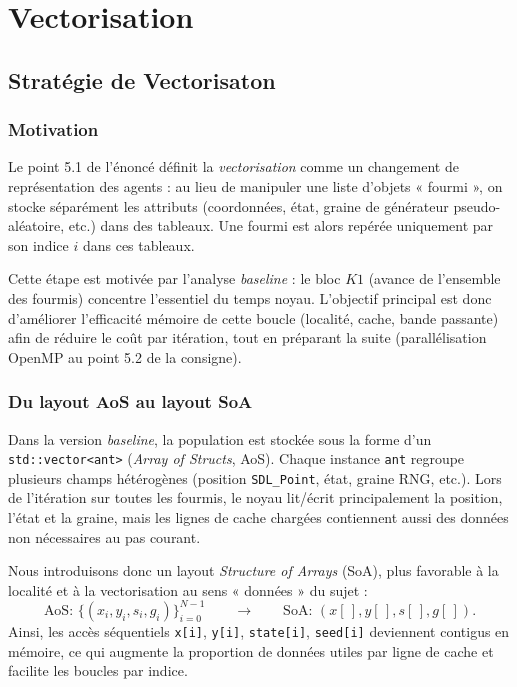 \section{Vectorisation}

\subsection{Stratégie de Vectorisaton}

\subsubsection{Motivation}

Le point 5.1 de l'énoncé définit la \emph{vectorisation} comme un changement de représentation des agents :
au lieu de manipuler une liste d'objets « fourmi », on stocke séparément les attributs (coordonnées, état,
graine de générateur pseudo-aléatoire, etc.) dans des tableaux. Une fourmi est alors repérée uniquement par
son indice $i$ dans ces tableaux.

Cette étape est motivée par l'analyse \emph{baseline} : le bloc $K1$ (avance de l'ensemble des fourmis)
concentre l'essentiel du temps noyau. L'objectif principal est donc d'améliorer l'efficacité mémoire de cette
boucle (localité, cache, bande passante) afin de réduire le coût par itération, tout en préparant la suite
(parallélisation OpenMP au point 5.2 de la consigne).

\subsubsection{Du layout AoS au layout SoA}

Dans la version \emph{baseline}, la population est stockée sous la forme d'un \texttt{std::vector<ant>}
(\textit{Array of Structs}, AoS). Chaque instance \texttt{ant} regroupe plusieurs champs hétérogènes
(position \texttt{SDL\_Point}, état, graine RNG, etc.). Lors de l'itération sur toutes les fourmis, le noyau
lit/écrit principalement la position, l'état et la graine, mais les lignes de cache chargées contiennent aussi
des données non nécessaires au pas courant.

Nous introduisons donc un layout \textit{Structure of Arrays} (SoA), plus favorable à la localité et à la
vectorisation au sens « données » du sujet :
\[
\text{AoS: } \{(x_i, y_i, s_i, g_i)\}_{i=0}^{N-1}
\qquad\longrightarrow\qquad
\text{SoA: } (x[\,], y[\,], s[\,], g[\,]).
\]
Ainsi, les accès séquentiels \texttt{x[i]}, \texttt{y[i]}, \texttt{state[i]}, \texttt{seed[i]} deviennent
contigus en mémoire, ce qui augmente la proportion de données utiles par ligne de cache et facilite les boucles
par indice.

